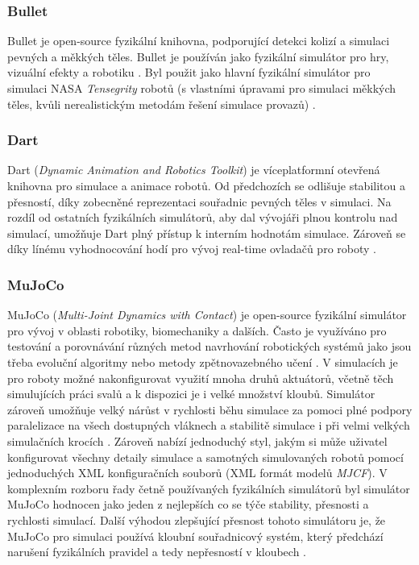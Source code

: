 \subsubsection{Bullet} \label{Bullet}
Bullet je open-source fyzikální knihovna, podporující detekci kolizí a simulaci
pevných a měkkých těles. Bullet je používán jako fyzikální simulátor pro hry,
vizuální efekty a robotiku \citep{coumans}. Byl použit jako hlavní fyzikální
simulátor pro simulaci NASA \emph{Tensegrity} robotů (s vlastními úpravami pro
simulaci měkkých těles, kvůli nerealistickým metodám řešení simulace provazů)
\citep{izadi2018simulating}.

\subsubsection{Dart} \label{Dart}
Dart (\emph{Dynamic Animation and Robotics Toolkit}) je víceplatformní otevřená
knihovna pro simulace a animace robotů. Od předchozích se odlišuje stabilitou a
přesností, díky zobecněné reprezentaci souřadnic pevných těles v simulaci. Na
rozdíl od ostatních fyzikálních simulátorů, aby dal vývojáři plnou kontrolu nad
simulací, umožňuje Dart plný přístup k interním hodnotám simulace. Zároveň se
díky línému vyhodnocování hodí pro vývoj real-time ovladačů pro roboty
\citep{lee2018dart}.

\subsubsection{MuJoCo} \label{MuJoCo}
MuJoCo (\emph{Multi-Joint Dynamics with Contact}) \citep{deepmind_2021} je
open-source fyzikální simulátor pro vývoj v oblasti robotiky, biomechaniky a
dalších. Často je využíváno pro testování a porovnávání různých metod
navrhování robotických systémů jako jsou třeba evoluční algoritmy nebo metody
zpětnovazebného učení \citep{salimans2017evolution}. V simulacích je pro roboty
možné nakonfigurovat využití mnoha druhů aktuátorů, včetně těch simulujících
práci svalů a k dispozici je i velké množství kloubů. Simulátor zároveň
umožňuje velký nárůst v rychlosti běhu simulace za pomoci plné podpory
paralelizace na všech dostupných vláknech a stabilitě simulace i při velmi
velkých simulačních krocích \citep{todorov2012mujoco}. Zároveň nabízí
jednoduchý styl, jakým si může uživatel konfigurovat všechny detaily simulace a
samotných simulovaných robotů pomocí jednoduchých XML konfiguračních souborů
(XML formát modelů \emph{MJCF}). V komplexním rozboru řady četně používaných
fyzikálních simulátorů byl simulátor MuJoCo hodnocen jako jeden z nejlepších co
se týče stability, přesnosti a rychlosti simulací. Další výhodou zlepšující
přesnost tohoto simulátoru je, že MuJoCo pro simulaci používá kloubní
souřadnicový systém, který předchází narušení fyzikálních pravidel a tedy
nepřesností v kloubech \citep{erez2015simulation}.

